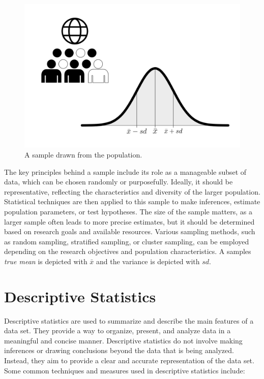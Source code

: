 \documentclass[
  a4paper,
]{scrbook}
\begin{document}
\begin{figure}[ht]

{\centering \includegraphics[width=0.75\linewidth,height=\textheight,keepaspectratio]{chapter000/003_Sample.png}

}

\caption{A sample drawn from the population.}

\end{figure}%

The key principles behind a sample include its role as a manageable
subset of data, which can be chosen randomly or purposefully. Ideally,
it should be representative, reflecting the characteristics and
diversity of the larger population. Statistical techniques are then
applied to this sample to make inferences, estimate population
parameters, or test hypotheses. The size of the sample matters, as a
larger sample often leads to more precise estimates, but it should be
determined based on research goals and available resources. Various
sampling methods, such as random sampling, stratified sampling, or
cluster sampling, can be employed depending on the research objectives
and population characteristics. A samples \emph{true mean} is depicted
with \hyperref[mean-gloss]{\(\bar{x}\)} and the variance is depicted
with \hyperref[sd-gloss]{\(sd\)}.

\section{Descriptive Statistics}\label{descriptive-statistics}

Descriptive statistics are used to summarize and describe the main
features of a data set. They provide a way to organize, present, and
analyze data in a meaningful and concise manner. Descriptive statistics
do not involve making inferences or drawing conclusions beyond the data
that is being analyzed. Instead, they aim to provide a clear and
accurate representation of the data set. Some common techniques and
measures used in descriptive statistics include:
\end{document}
